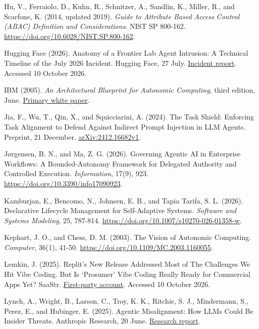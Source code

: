 \documentclass[preprint,12pt,authoryear]{elsarticle}
\begin{document}
Hu, V., Ferraiolo, D., Kuhn, R., Schnitzer, A., Sandlin, K., Miller, R.,
and Scarfone, K. (2014, updated 2019). \emph{Guide to Attribute Based
Access Control (ABAC) Definition and Considerations}. NIST SP 800-162.
\url{https://doi.org/10.6028/NIST.SP.800-162}.

Hugging Face (2026). Anatomy of a Frontier Lab Agent Intrusion: A
Technical Timeline of the July 2026 Incident. Hugging Face, 27 July.
\href{https://huggingface.co/blog/agent-intrusion-technical-timeline}{Incident
report}. Accessed 10 October 2026.

IBM (2005). \emph{An Architectural Blueprint for Autonomic Computing},
third edition, June.
\href{https://users.cs.fiu.edu/~sadjadi/Teaching/Autonomic\%20Grid\%20Computing/CIS-6612-Summer-2006/AC-Blueprint-WhitePaper-V7.pdf}{Primary
white paper}.

Jia, F., Wu, T., Qin, X., and Squicciarini, A. (2024). The Task Shield:
Enforcing Task Alignment to Defend Against Indirect Prompt Injection in
LLM Agents. Preprint, 21 December.
\href{https://arxiv.org/abs/2412.16682v1}{arXiv:2412.16682v1}.

Jørgensen, B. N., and Ma, Z. G. (2026). Governing Agentic AI in
Enterprise Workflows: A Bounded-Autonomy Framework for Delegated
Authority and Controlled Execution. \emph{Information}, 17(9), 923.
\url{https://doi.org/10.3390/info17090923}.

Kamburjan, E., Bencomo, N., Johnsen, E. B., and Tapia Tarifa, S. L.
(2026). Declarative Lifecycle Management for Self-Adaptive Systems.
\emph{Software and Systems Modeling}, 25, 787-814.
\url{https://doi.org/10.1007/s10270-026-01358-w}.

Kephart, J. O., and Chess, D. M. (2003). The Vision of Autonomic
Computing. \emph{Computer}, 36(1), 41-50.
\url{https://doi.org/10.1109/MC.2003.1160055}.

Lemkin, J. (2025). Replit's New Release Addressed Most of The Challenges
We Hit Vibe Coding. But Is `Prosumer' Vibe Coding Really Ready for
Commercial Apps Yet? SaaStr.
\href{https://www.saastr.com/replits-new-release-address-most-of-the-challenges-we-hit-vibe-coding-but-is-prosumer-vibe-coding-really-ready-for-commercial-apps-yet/}{First-party
account}. Accessed 10 October 2026.

Lynch, A., Wright, B., Larson, C., Troy, K. K., Ritchie, S. J.,
Mindermann, S., Perez, E., and Hubinger, E. (2025). Agentic
Misalignment: How LLMs Could Be Insider Threats. Anthropic Research, 20
June.
\href{https://www.anthropic.com/research/agentic-misalignment}{Research
report}.
\end{document}
